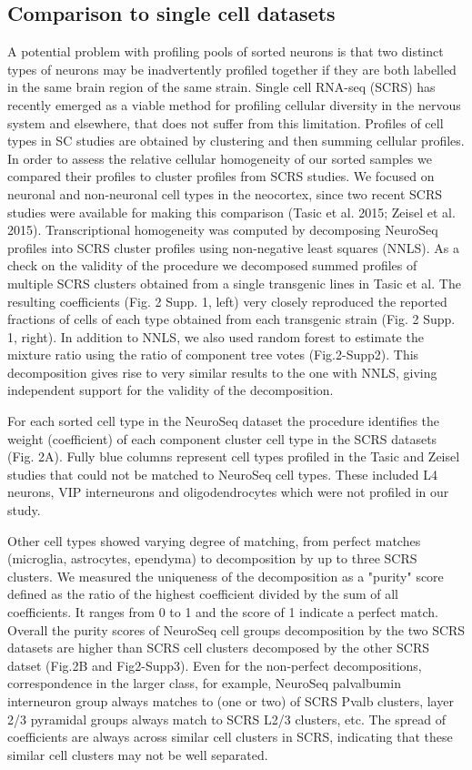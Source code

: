 \subsection{Comparison to single cell datasets}
A potential problem with profiling pools of sorted neurons is that two distinct types of neurons may be inadvertently profiled together if they are both labelled in the same brain region of the same strain. Single cell RNA-seq (SCRS) has recently emerged as a viable method for profiling cellular diversity in the nervous system and elsewhere, that does not suffer from this limitation. Profiles of cell types in SC studies are obtained by clustering and then summing cellular profiles. In order to assess the relative cellular homogeneity of our sorted samples we compared their profiles to cluster profiles from SCRS studies. We focused on neuronal and non-neuronal cell types in the neocortex, since two recent SCRS studies were available for making this comparison (Tasic et al. 2015; Zeisel et al. 2015). Transcriptional homogeneity was computed by decomposing NeuroSeq profiles into SCRS cluster profiles using non-negative least squares (NNLS). As a check on the validity of the procedure we decomposed summed profiles of multiple SCRS clusters obtained from a single transgenic lines in Tasic et al. The resulting coefficients (Fig. 2 Supp. 1, left) very closely reproduced the reported fractions of cells of each type obtained from each transgenic strain (Fig. 2 Supp. 1, right). In addition to NNLS, we also used random forest to estimate the mixture ratio using the ratio of component tree votes (Fig.2-Supp2). This decomposition gives rise to very similar results to the one with NNLS, giving independent support for the validity of the decomposition. 

For each sorted cell type in the NeuroSeq dataset the procedure identifies the weight (coefficient) of each component cluster cell type in the SCRS datasets (Fig. 2A). Fully blue columns represent cell types profiled in the Tasic and Zeisel studies that could not be matched to NeuroSeq cell types. These included L4 neurons, VIP interneurons and oligodendrocytes which were not profiled in our study. 

Other cell types showed varying degree of matching, from perfect matches (microglia, astrocytes, ependyma) to decomposition by up to three SCRS clusters. We measured the uniqueness of the decomposition as a "purity" score defined as the ratio of the highest coefficient divided by the sum of all coefficients. It ranges from 0 to 1 and the score of 1 indicate a perfect match. Overall the purity scores of NeuroSeq cell groups decomposition by the two SCRS datasets are higher than SCRS cell clusters decomposed by the other SCRS datset (Fig.2B and Fig2-Supp3). Even for the non-perfect decompositions, correspondence in the larger class, for example, NeuroSeq palvalbumin interneuron group always matches to (one or two) of SCRS Pvalb clusters, layer 2/3 pyramidal groups always match to SCRS L2/3 clusters, etc. The spread of coefficients are always across similar cell clusters in SCRS, indicating that these similar cell clusters may not be well separated. 


